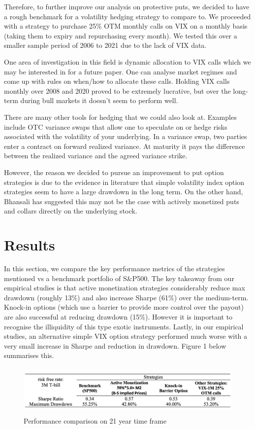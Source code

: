 \documentclass[12pt]{article}
\begin{document}
{{Therefore, to further improve our analysis on protective puts, we decided to have a rough benchmark for a volatility hedging strategy to compare to. We proceeded with a strategy to purchase 25\% OTM monthly calls on VIX on a monthly basis (taking them to expiry and repurchasing every month). We tested this over a smaller sample period of 2006 to 2021 due to the lack of VIX data. 

One area of investigation in this field is dynamic allocation to VIX calls which we may be interested in for a future paper. One can analyse market regimes and come up with rules on when/how to allocate these calls. Holding VIX calls monthly over 2008 and 2020 proved to be extremely lucrative, but over the long-term during bull markets it doesn't seem to perform well. 

There are many other tools for hedging that we could also look at. Examples include OTC variance swaps that allow one to speculate on or hedge risks associated with the volatility of your underlying. In a variance swap, two parties enter a contract on forward realized variance. At maturity it pays the difference between the realized variance and the agreed variance strike.

However, the reason we decided to pursue an improvement to put option strategies is due to the evidence in literature that simple volatility index option strategies seem to have a large drawdown in the long term. On the other hand, Bhansali has suggested this may not be the case with actively monetized puts and collars directly on the underlying stock.

\section{Results}
In this section, we compare the key performance metrics of the strategies mentioned vs a benchmark portfolio of S\&P500. The key takeaway from our empirical studies is that active monetization strategies considerably reduce max drawdown (roughly 13\%) and also increase Sharpe (61\%) over the medium-term. Knock-in options (which use a barrier to provide more control over the payout) are also successful at reducing drawdown (15\%). However it is important to recognise the illiquidity of this type exotic instruments. Lastly, in our empirical studies, an alternative simple VIX option strategy performed much worse with a very small increase in Sharpe and reduction in drawdown. Figure 1 below summarises this. 

\begin{figure}[htp]
    \centering
    \includegraphics[width=15cm, height=2.5cm]{summary.jpg}
    \caption{Performance comparison on 21 year time frame}
    \label{fig:galaxy}
\end{figure}



}}
\end{document}
